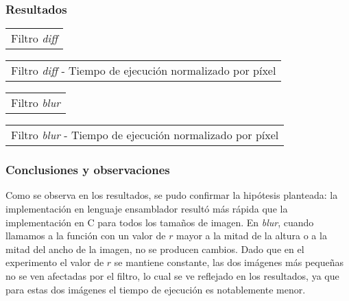         \subsubsection*{Resultados}
            {\centering \begin{tabular}{c}
              {\small Filtro \emph{diff}} \\
            \end{tabular}}

            {\centering \begin{tabular}{c}
              {\small Filtro \emph{diff} - Tiempo de ejecución normalizado por píxel} \\
            \end{tabular}}

            {\centering \begin{tabular}{c}
              {\small Filtro \emph{blur}} \\
            \end{tabular}}

            {\centering \begin{tabular}{c}
              {\small Filtro \emph{blur} - Tiempo de ejecución normalizado por píxel} \\
            \end{tabular}}

        \subsubsection*{Conclusiones y observaciones} 
            Como se observa en los resultados, se pudo confirmar la hipótesis planteada: la implementación en lenguaje ensamblador resultó más rápida que la implementación en C para todos los tamaños de imagen.
            En \emph{blur}, cuando llamamos a la función con un valor de $r$ mayor a la mitad de la altura o a la mitad del ancho de la imagen, no se producen cambios. Dado que en el experimento el valor de $r$ se mantiene constante, las dos imágenes más pequeñas no se ven afectadas por el filtro, lo cual se ve reflejado en los resultados, ya que para estas dos imágenes el tiempo de ejecución es notablemente menor.

